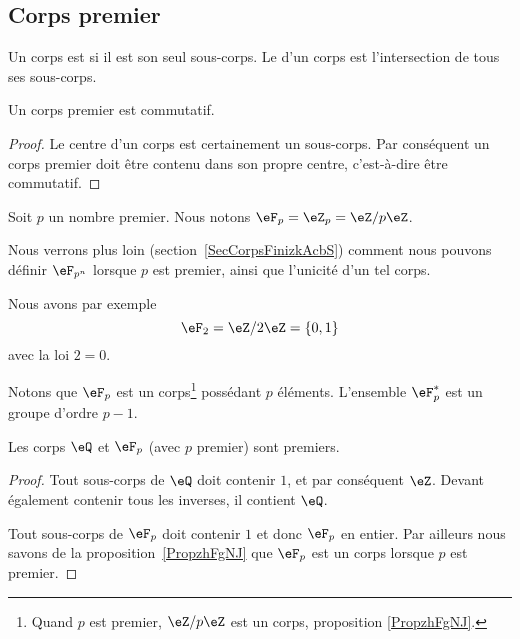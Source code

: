 \subsection{Corps premier}
\label{subseccorpspremhBlYIv}

\begin{definition}      \label{DEFooQSOFooIeSKpq}
	Un corps est  si il est son seul sous-corps. Le  d'un corps est l'intersection de tous ses sous-corps.
\end{definition}

\begin{lemma}
	Un corps premier est commutatif.
\end{lemma}

\begin{proof}
	Le centre d'un corps est certainement un sous-corps. Par conséquent un corps premier doit être contenu dans son propre centre, c'est-à-dire être commutatif.
\end{proof}

\begin{definition}  \label{DefXIHLooBAcqYH}
	Soit \( p\) un nombre premier. Nous notons \( \eF_p=\eZ_p=\eZ/p\eZ\).
\end{definition}

Nous verrons plus loin (section~\ref{SecCorpsFinizkAcbS}) comment nous pouvons définir \( \eF_{p^n}\) lorsque \( p\) est premier, ainsi que l'unicité d'un tel corps.

Nous avons par exemple
\begin{equation}
	\eF_2=\eZ/2\eZ=\{ 0,1 \}
\end{equation}
avec la loi \( 2=0\).

Notons que \( \eF_p\) est un corps\footnote{Quand \( p\) est premier, \( \eZ/p\eZ\) est un corps, proposition \ref{PropzhFgNJ}.} possédant \( p\) éléments. L'ensemble \( \eF_p^*\) est un groupe d'ordre \( p-1\).

\begin{lemma}
	Les corps \( \eQ\) et \( \eF_p\) (avec \( p\) premier) sont premiers.
\end{lemma}

\begin{proof}
	Tout sous-corps de \( \eQ\) doit contenir \( 1\), et par conséquent \( \eZ\). Devant également contenir tous les inverses, il contient \( \eQ\).

	Tout sous-corps de \(\eF_p \) doit contenir \( 1\) et donc \( \eF_p\) en entier. Par ailleurs nous savons de la proposition~\ref{PropzhFgNJ} que \( \eF_p\) est un corps lorsque \( p\) est premier.
\end{proof}

